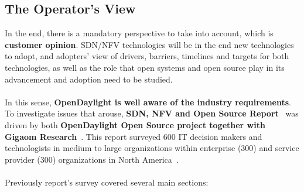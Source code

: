 \documentclass[a4paper, 12pt]{book}
\begin{document}
\subsection{The Operator's View}
In the end, there is a mandatory perspective to take into account, which is \textbf{customer opinion}. SDN/NFV technologies will be in the end new technologies to adopt, and adopters' view of drivers, barriers, timelines and targets for both technologies, as well as the role that open systems and open source play in its advancement and adoption need to be studied.\\
\\
In this sense, \textbf{OpenDaylight is well aware of the industry requirements}. To investigate issues that arouse, \textbf{SDN, NFV and Open Source Report}~\cite{SDNandNFVOperatorsView} was driven by both \textbf{OpenDaylight Open Source project together with Gigaom Research}~\cite{GigaomResearch}. This report surveyed 600 IT decision makers and technologists in medium to large organizations within enterprise (300) and service provider (300) organizations in North America~\cite{SDNandNFVOperatorsView}.\\
\\
Previously report's survey covered several main sections:
\end{document}
